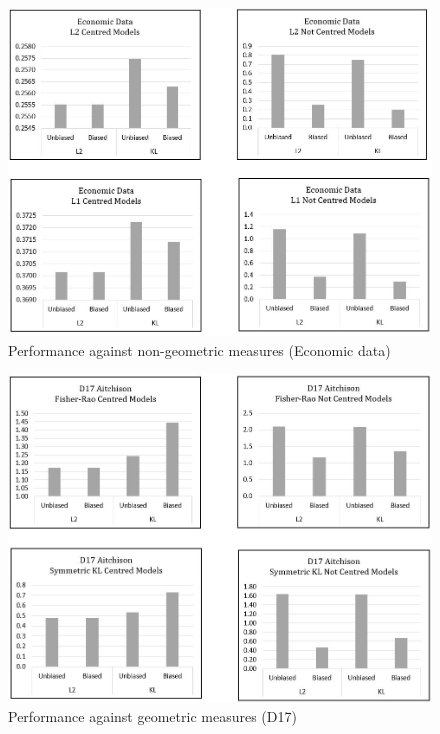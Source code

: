 \documentclass[BSc]{usydthesis}
\numberwithin{equation}{chapter}
\theoremstyle{remark}
\begin{document}
\begin{figure}
 \centering
 \includegraphics[scale=0.6,keepaspectratio=true]{graphs/G-Eco2.JPG}
 \caption{Performance against non-geometric measures (Economic data)}
\end{figure}

\newpage

\begin{figure}
 \centering
 \includegraphics[scale=0.6,keepaspectratio=true]{graphs/G-D17-1.JPG}
 \caption{Performance against geometric measures (D17)}
\end{figure}
\end{document}
